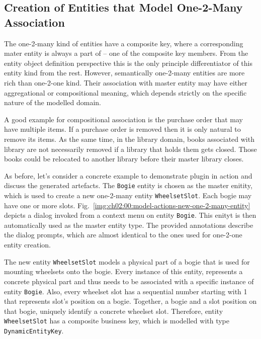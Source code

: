     
  \subsection{Creation of Entities that Model One-2-Many Association}  
  
  The one-2-many kind of entities have a composite key, where a corresponding mater entity is always a part of -- one of the composite key members.
  From the entity object definition perspective this is the only principle differentiator of this entity kind from the rest.
  However, semantically one-2-many entities are more rich than one-2-one kind.
  Their association with master entity may have either aggregational or compositional meaning, which depends strictly on the specific nature of the modelled domain.
  
  A good example for compositional association is the purchase order that may have multiple items.
  If a purchase order is removed then it is only natural to remove its items.
  As the same time, in the library domain, books associated with library are not necessarily removed if a library that holds them gets closed.
  Those books could be relocated to another library before their master library closes.
  
  As before, let's consider a concrete example to demonstrate plugin in action and discuss the generated artefacts.
  The \texttt{Bogie} entity is chosen as the master enitity, which is used to create a new one-2-many entity \texttt{WheelsetSlot}.
  Each bogie may have one or more slots.
  Fig.~\ref{img:ch02:00:model-actions-new-one-2-many-entity} depicts a dialog invoked from a context menu on entity \texttt{Bogie}.
  This enityt is then automatically used as the master entity type.
  The provided annotations describe the dialog prompts, which are almost identical to the ones used for one-2-one entity creation.
  
  The new entity \texttt{WheelsetSlot} models a physical part of a bogie that is used for mounting wheelsets onto the bogie.
  Every instance of this entity, represents a concrete physical part and thus needs to be associated with a specific instance of entity \texttt{Bogie}.
  Also, every wheelset slot has a sequential number starting with 1 that represents slot's position on a bogie.
  Together, a bogie and a slot position on that bogie, uniquely identify a concrete wheelset slot.
  Therefore, entity \texttt{WheelsetSlot} has a composite business key, which is modelled with type \texttt{DynamicEntityKey}.
  

